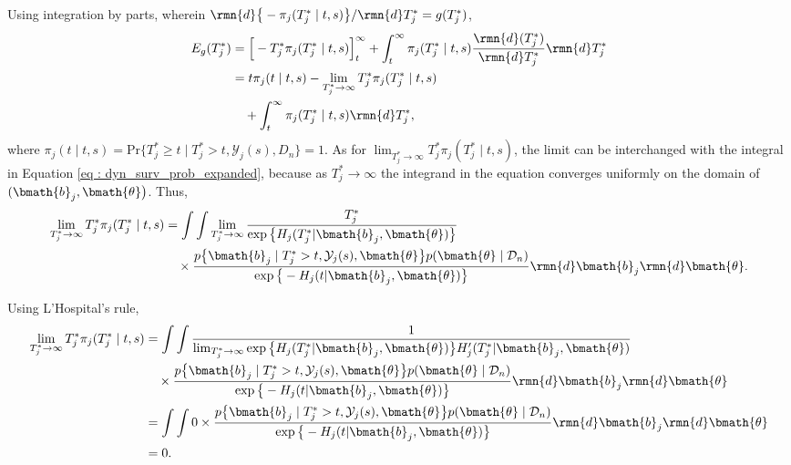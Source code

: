 Using integration by parts, wherein ${\rmn{d} \big\{-\pi_j(T^*_j \mid t, s)\big\}}/{\rmn{d} T^*_j} = g(T^*_j)$,
\begin{equation*}
\begin{split}
E_g(T^*_j) &= \Big[-T^*_j\pi_j(T^*_j \mid t, s)\Big]_t^\infty + \int_t^{\infty} \pi_j(T^*_j \mid t, s) \frac{\rmn{d} (T^*_j)}{\rmn{d} T^*_j} \rmn{d} T^*_j\\
&= t \pi_j(t \mid t, s) - \lim_{T^*_j\to \infty}T^*_j \pi_j(T^*_j \mid t, s) \\ & \quad + \int_t^{\infty} \pi_j(T^*_j \mid t, s) \rmn{d} T^*_j,
\end{split}
\end{equation*}
where $\pi_j(t \mid t, s) = \mbox{Pr}\big\{T^*_j \geq t \mid  T^*_j >t, \mathcal{Y}_j(s), D_n\big\} = 1$. As for $\lim_{T^*_j\to \infty}T^*_j \pi_j(T^*_j \mid t, s)$, the limit can be interchanged with the integral in Equation \ref{eq : dyn_surv_prob_expanded}, because as $T^*_j\to \infty$ the integrand in the equation converges uniformly on the domain of $(\bmath{b}_j, \bmath{\theta}\big)$. Thus,
\begin{equation*}
\begin{split}
\lim_{T^*_j\to \infty}T^*_j \pi_j(T^*_j \mid t, s) &=  \int \int \lim_{T^*_j\to \infty} \frac{T^*_j}{\exp\big\{H_j(T^*_j | \bmath{b}_j, \bmath{\theta})\big\}} \\ & \quad \times \frac{p\big\{\bmath{b}_j \mid T^*_j>t, \mathcal{Y}_j(s), \bmath{\theta}\big\} p(\bmath{\theta} \mid \mathcal{D}_n)}{\exp\big\{-H_j(t | \bmath{b}_j, \bmath{\theta})\big\}}  \rmn{d} \bmath{b}_j \rmn{d} \bmath{\theta}.\end{split}
\end{equation*}

Using L'Hospital's rule,
\begin{equation*}
\begin{split}
\lim_{T^*_j\to \infty}T^*_j \pi_j(T^*_j \mid t, s) &=  \int \int \frac{1}{\lim_{T^*_j\to \infty} \exp\big\{H_j(T^*_j | \bmath{b}_j, \bmath{\theta})\big\}H'_j(T^*_j | \bmath{b}_j, \bmath{\theta})} \\ & \quad \times \frac{p\big\{\bmath{b}_j \mid T^*_j>t, \mathcal{Y}_j(s), \bmath{\theta}\big\}p(\bmath{\theta} \mid \mathcal{D}_n)}{\exp\big\{-H_j(t | \bmath{b}_j, \bmath{\theta})\big\}} \rmn{d} \bmath{b}_j \rmn{d} \bmath{\theta}\\
&= \int \int 0 \times \frac{p\big\{\bmath{b}_j \mid T^*_j>t, \mathcal{Y}_j(s), \bmath{\theta}\big\}p(\bmath{\theta} \mid \mathcal{D}_n)}{\exp\big\{-H_j(t | \bmath{b}_j, \bmath{\theta})\big\}}  \rmn{d} \bmath{b}_j \rmn{d} \bmath{\theta}\\
&= 0.
\end{split}
\end{equation*}

